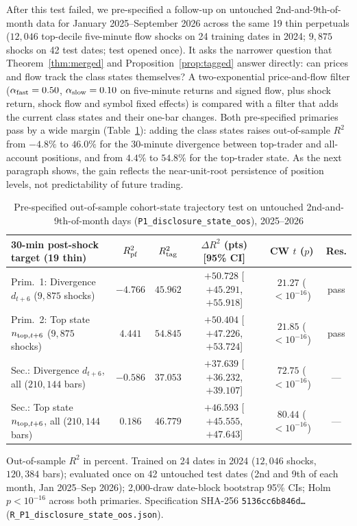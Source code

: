 \documentclass[12pt]{article}
\theoremstyle{definition}
\theoremstyle{remark}
\begin{document}
After this test failed, we pre-specified a follow-up on untouched 2nd-and-9th-of-month data for January 2025--September 2026 across the same 19 thin perpetuals ($12{,}046$ top-decile five-minute flow shocks on 24 training dates in 2024; $9{,}875$ shocks on 42 test dates; test opened once). It asks the narrower question that Theorem~\ref{thm:merged} and Proposition~\ref{prop:tagged} answer directly: can prices and flow track the class states themselves? A two-exponential price-and-flow filter ($\alpha_{\rm fast}=0.50$, $\alpha_{\rm slow}=0.10$ on five-minute returns and signed flow, plus shock return, shock flow and symbol fixed effects) is compared with a filter that adds the current class states and their one-bar changes. Both pre-specified primaries pass by a wide margin (Table~\ref{tab:disc_state_oos}): adding the class states raises out-of-sample $R^2$ from $-4.8\%$ to $46.0\%$ for the 30-minute divergence between top-trader and all-account positions, and from $4.4\%$ to $54.8\%$ for the top-trader state. As the next paragraph shows, the gain reflects the near-unit-root persistence of position levels, not predictability of future trading.

\begin{table}[!htbp]\centering\footnotesize
\begin{threeparttable}
\caption{Pre-specified out-of-sample cohort-state trajectory test on untouched 2nd-and-9th-of-month days (\texttt{P1\_disclosure\_state\_oos}), 2025--2026}\label{tab:disc_state_oos}
\setlength{\tabcolsep}{1.4pt}
\begin{tabular}{lccccc}
\toprule
30-min post-shock target (19 thin) & $R^2_{\rm pf}$ & $R^2_{\rm tag}$ & $\Delta R^2$ (pts) [95\% CI] & CW $t$ ($p$) & Res.\\
\midrule
Prim.\ 1: Divergence $d_{t+6}$ ($9{,}875$ shocks) & $-4.766$ & $45.962$ & $+50.728$ [$+45.291$, $+55.918$] & $21.27$ ($<10^{-16}$) & pass\\
Prim.\ 2: Top state $n_{{\rm top},t+6}$ ($9{,}875$ shocks) & $4.441$ & $54.845$ & $+50.404$ [$+47.226$, $+53.724$] & $21.85$ ($<10^{-16}$) & pass\\
Sec.: Divergence $d_{t+6}$, all ($210{,}144$ bars) & $-0.586$ & $37.053$ & $+37.639$ [$+36.232$, $+39.107$] & $72.75$ ($<10^{-16}$) & ---\\
Sec.: Top state $n_{{\rm top},t+6}$, all ($210{,}144$ bars) & $0.186$ & $46.779$ & $+46.593$ [$+45.555$, $+47.643$] & $80.44$ ($<10^{-16}$) & ---\\
\bottomrule
\end{tabular}
\begin{tablenotes}\footnotesize\item Out-of-sample $R^2$ in percent. Trained on 24 dates in 2024 ($12{,}046$ shocks, $120{,}384$ bars); evaluated once on 42 untouched test dates (2nd and 9th of each month, Jan 2025--Sep 2026); 2{,}000-draw date-block bootstrap 95\% CIs; Holm $p<10^{-16}$ across both primaries. Specification SHA-256 \texttt{5136cc6b846d\ldots} (\texttt{R\_P1\_disclosure\_state\_oos.json}).\end{tablenotes}
\end{threeparttable}
\end{table}
\end{document}
